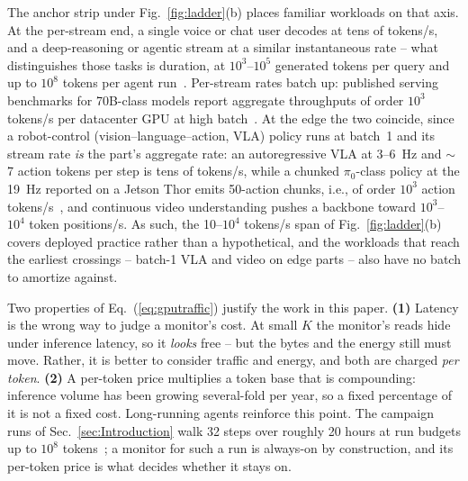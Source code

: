 \documentclass[conference]{IEEEtran}
\begin{document}
The anchor strip under Fig.~\ref{fig:ladder}(b) places familiar
workloads on that axis. At the per-stream end, a single voice or chat
user decodes at tens of tokens/s, and a deep-reasoning or agentic
stream at a similar instantaneous rate -- what distinguishes those
tasks is duration, at $10^{3}$--$10^{5}$ generated tokens per query
and up to $10^{8}$ tokens per agent run~\cite{aisi2026cyber}.
Per-stream rates batch up: published serving benchmarks for 70B-class
models report aggregate throughputs of order $10^{3}$ tokens/s per
datacenter GPU at high batch~\cite{lyceum2026tps}. At the edge the
two coincide, since a robot-control (vision--language--action, VLA)
policy runs at batch~1 and its stream rate \emph{is} the part's
aggregate rate: an autoregressive VLA at 3--6~Hz and $\sim$7 action
tokens per step is tens of tokens/s, while a chunked $\pi_0$-class
policy at the 19~Hz reported on a Jetson Thor emits 50-action chunks,
i.e., of order $10^{3}$ action tokens/s~\cite{vlaperf2026}, and
continuous video understanding pushes a backbone toward
$10^{3}$--$10^{4}$ token positions/s. As such, the 10--$10^{4}$
tokens/s span of Fig.~\ref{fig:ladder}(b) covers deployed practice
rather than a hypothetical, and the workloads that reach the earliest
crossings -- batch-1 VLA and video on edge parts -- also have no
batch to amortize against.

Two properties of Eq.~(\ref{eq:gputraffic}) justify the work in this
paper. {\bf (1)} Latency is the wrong way to judge a monitor's cost.
At small $K$ the monitor's reads hide under inference latency, so it
\emph{looks} free -- but the bytes and the energy still must move.
Rather, it is better to consider traffic and energy, and
both are charged \emph{per token}. {\bf (2)} A per-token price
multiplies a token base that is compounding: inference volume has
been growing several-fold per year, so a fixed percentage of it is
not a fixed cost. Long-running agents reinforce this
point.
The campaign runs of Sec.~\ref{sec:Introduction} walk 32 steps over
roughly 20 hours at run budgets up to $10^{8}$
tokens~\cite{aisi2026cyber}; a monitor for such a run is always-on by
construction, and its per-token price is what decides whether it
stays on.
\end{document}
